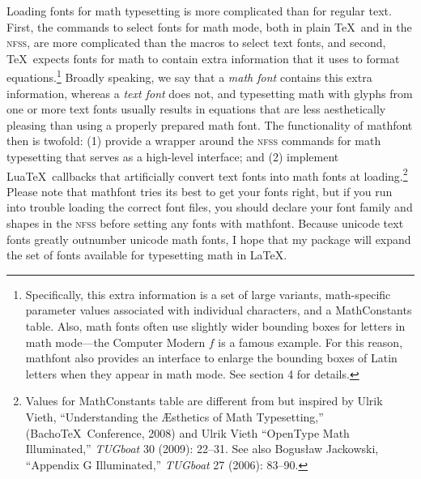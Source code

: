 \documentclass[12pt,twoside]{article}
\begin{document}
Loading fonts for math typesetting is more complicated than for regular text. First, the commands to select fonts for math mode, both in plain \TeX\ and in the \textsc{nfss}, are more complicated than the macros to select text fonts, and second, \TeX\ expects fonts for math to contain extra information that it uses to format equations.\footnote{Specifically, this extra information is a set of large variants, math-specific parameter values associated with individual characters, and a MathConstants table. Also, math fonts often use slightly wider bounding boxes for letters in math mode---the Computer Modern $f$ is a famous example. For this reason, \textsf{mathfont} also provides an interface to enlarge the bounding boxes of Latin letters when they appear in math mode. See section 4 for details.} Broadly speaking, we say that a \textit{math font} contains this extra information, whereas a \textit{text font} does not, and typesetting math with glyphs from one or more text fonts usually results in equations that are less aesthetically pleasing than using a properly prepared math font. The functionality of \textsf{mathfont} then is twofold: (1) provide a wrapper around the \textsc{nfss} commands for math typesetting that serves as a high-level interface; and (2) implement Lua\TeX\ callbacks that artificially convert text fonts into math fonts at loading.\footnote{Values for MathConstants table are different from but inspired by Ulrik Vieth, ``Understanding the \AE sthetics of Math Typesetting,'' (Bacho\TeX\ Conference, 2008) and Ulrik Vieth ``OpenType Math Illuminated,'' \textit{TUGboat} 30 (2009): 22--31. See also Bogus\l aw Jackowski, ``Appendix G Illuminated,'' \textit{TUGboat} 27 (2006): 83--90.} Please note that \textsf{mathfont} tries its best to get your fonts right, but if you run into trouble loading the correct font files, you should declare your font family and shapes in the \textsc{nfss} before setting any fonts with \textsf{mathfont}. Because unicode text fonts greatly outnumber unicode math fonts, I hope that my package will expand the set of fonts available for typesetting math in \LaTeX.
\end{document}
